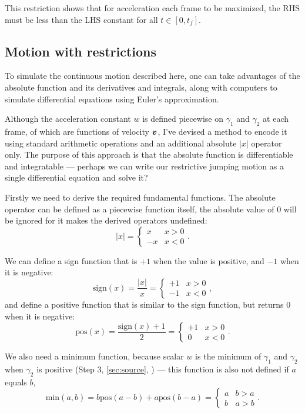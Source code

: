 This restriction shows that for acceleration each frame to be maximized, the RHS must be less than the LHS constant for all $t \in [0, t_f]$.

\subsection{Motion with restrictions}
To simulate the continuous motion described here, one can take advantages of the absolute function and its derivatives and integrals, along with computers to simulate differential equations using Euler's approximation.

Although the acceleration constant $w$ is defined piecewise on $\gamma_1$ and $\gamma_2$ at each frame, of which are functions of velocity $\boldsymbol{v}$, I've devised a method to encode it using standard arithmetic operations and an additional absolute $|x|$ operator only. The purpose of this approach is that the absolute function is differentiable and integratable --- perhaps we can write our restrictive jumping motion as a single differential equation and solve it?

Firstly we need to derive the required fundamental functions. The absolute operator can be defined as a piecewise function itself, the absolute value of $0$ will be ignored for it makes the derived operators undefined:
\[
    |x| = \begin{cases}
        x & x > 0\\
        -x & x < 0
    \end{cases}.
\]

We can define a sign function that is $+1$ when the value is positive, and $-1$ when it is negative:
\[
    \text{sign}(x) = \frac{|x|}{x} = \begin{cases}
        +1 & x > 0\\
        -1 & x < 0
    \end{cases},
\]
and define a positive function that is similar to the sign function, but returns $0$ when it is negative:
\[
    \text{pos}(x) = \frac{\text{sign}(x) + 1}{2} = \begin{cases}
        +1 & x > 0\\
        0 & x < 0
    \end{cases}.
\]

We also need a minimum function, because scalar $w$ is the minimum of $\gamma_1$ and $\gamma_2$ when $\gamma_2$ is positive (Step 3, \autoref{sec:source}, ) --- this function is also not defined if $a$ equals $b$,
\[
    \text{min}(a, b) = b \text{pos}(a - b) + a \text{pos}(b - a) = \begin{cases}
        a & b > a\\
        b & a > b
    \end{cases}.
\]

